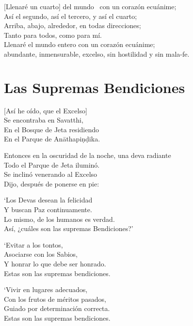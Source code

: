[Llenaré un cuarto] del mundo \pause\ con un corazón ecuánime;\\
Así el segundo, así el tercero, y así el cuarto;\\
Arriba, abajo, alrededor, en todas direcciones;\\
Tanto para todos, como para mí.\\
Llenaré el mundo entero con un corazón ecuánime;\\ abundante, inmensurable, excelso, sin hostilidad y sin mala-fe.


\clearpage

\chapter{Las Supremas Bendiciones}


\begin{leader}
\end{leader}

[Así he oído, que el Excelso]\\
Se encontraba en Savatthi,\\
En el Bosque de Jeta residiendo\\
En el Parque de Anāthapiṇḍika.

Entonces en la oscuridad de la noche, una deva radiante\\
Todo el Parque de Jeta iluminó.\\
Se inclinó venerando al Excelso\\
Dijo, después de ponerse en pie:

`Los Devas desean la felicidad\\
Y buscan Paz continuamente.\\
Lo mismo, de los humanos es verdad.\\
Así, ¿cuáles son las supremas Bendiciones?'

`Evitar a los tontos,\\
Asociarse con los Sabios,\\
Y honrar lo que debe ser honrado.\\
Estas son las supremas bendiciones.

`Vivir en lugares adecuados,\\
Con los frutos de méritos pasados,\\
Guiado por determinación correcta.\\
Estas son las supremas bendiciones.

